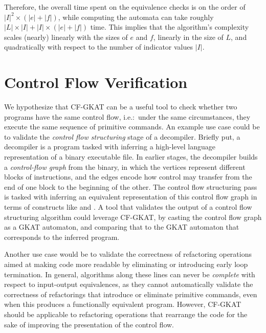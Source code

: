 Therefore, the overall time spent on the equivalence checks is on the order of \(|I|^2 × (|e|+|f|)\), while computing the automata can take roughly $|L| × |I| + |I| × (|e| + |f|)$ time. 
This implies that the algorithm's complexity scales (nearly) linearly with the sizes of \(e\) and \(f\), linearly in the size of $L$, and quadratically with respect to the number of indicator values \(|I|\).


\section{Control Flow Verification}%
\label{sec:experiments}


We hypothesize that CF-GKAT can be a useful tool to check whether two programs have the same control flow, i.e.:\ under the same circumstances, they execute the same sequence of primitive commands.
An example use case could be to validate
the \emph{control flow structuring} stage of a decompiler.
Briefly put, a decompiler is a program tasked with inferring a high-level language representation of a binary executable file.
In earlier stages, the decompiler builds a \emph{control-flow graph} from the binary, in which the vertices represent different blocks of instructions, and the edges encode how control may transfer from the end of one block to the beginning of the other.
The control flow structuring pass is tasked with inferring an equivalent representation of this control flow graph in terms of constructs like  and .
A tool that validates the output of a control flow structuring algorithm could leverage CF-GKAT, by casting the control flow graph as a GKAT automaton, and comparing that to the GKAT automaton that corresponds to the inferred program.

Another use case would be to validate
the correctness of refactoring operations aimed at making code more readable by eliminating or introducing early loop termination.
In general, algorithms along these lines can never be \emph{complete} with respect to input-output equivalences, as they cannot automatically validate the correctness of refactorings that introduce or eliminate primitive commands, even when this produces a functionally equivalent program.
However, CF-GKAT should be applicable to refactoring operations that rearrange the code for the sake of improving the presentation of the control flow.

